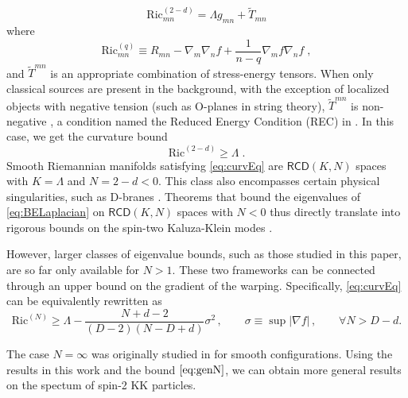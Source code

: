 \documentclass[12pt]{article}
\newcommand{\RCD}{\mathsf{RCD}}
\theoremstyle{plain}
\theoremstyle{definition}
\begin{document}
\begin{equation}
	\text{Ric}^{(2-d)}_{mn} = \Lambda g_{mn} + \tilde{T}_{mn}
\end{equation}
where
\begin{equation}
	\text{Ric}^{(q)}_{mn}\equiv	R_{mn} - \nabla_m \nabla_n f + \frac{1}{n-q} \nabla_m f \nabla_n f \;,
\end{equation}
and $\tilde{T}^{mn}$ is an appropriate combination of stress-energy tensors. When only classical sources are present in the background, with the exception of localized objects with negative tension (such as O-planes in string theory), $\tilde{T}^{mn}$ is non-negative \cite{deluca-t-leaps}, a condition named the Reduced Energy Condition (REC) in \cite{deluca-t-leaps}. In this case, we get the curvature bound
\begin{equation}\label{eq:curvEq}
	\text{Ric}^{(2-d)} \geqslant \Lambda\;.
\end{equation}
Smooth Riemannian manifolds satisfying \eqref{eq:curvEq} are $\RCD(K,N)$ spaces with $K = \Lambda$ and $N = 2-d <0$. This class also encompasses certain physical singularities, such as D-branes \cite{deluca-deponti-mondino-t,deluca-deponti-mondino-t-entropy}.
Theorems that bound the eigenvalues of \eqref{eq:BELaplacian} on $\RCD(K,N)$ spaces with $N<0$ thus directly translate into rigorous bounds on the spin-two Kaluza-Klein modes \cite[Sec.~6]{deluca-deponti-mondino-t-entropy}.

However, larger classes of eigenvalue bounds, such as those studied in this paper, are so far only available for $N>1$.
These two frameworks can be connected through an upper bound on the gradient of the warping.
Specifically, \eqref{eq:curvEq} can be equivalently rewritten as
\begin{equation}\label{eq:genN}
	\text{Ric}^{(N)}\geqslant \Lambda-\frac{N + d-2}{(D-2)(N-D+d)}\sigma^2\,,\qquad \sigma \equiv \sup{|\nabla f|}\,,\qquad \forall N> D-d.
\end{equation}

The case $N  = \infty$ was originally studied in \cite{deluca-t-leaps} for smooth configurations. Using the results in this work and the bound $\eqref{eq:genN}$, we can obtain more general results on the spectum of spin-2 KK particles.
\end{document}
